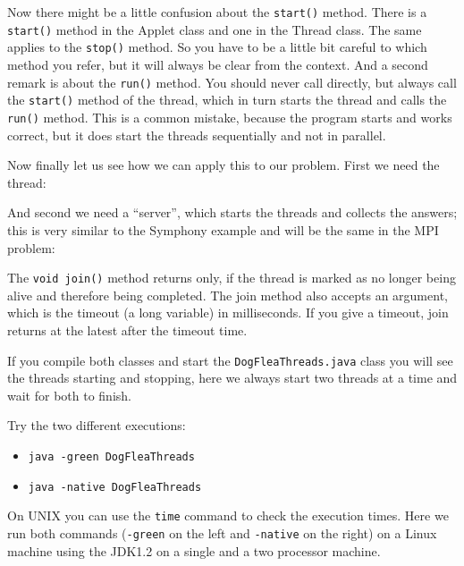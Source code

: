 Now there might be a little confusion about the \verb|start()| method.
There is a \verb|start()| method in the Applet class and one in the Thread
class. The same applies to the \verb|stop()| method. So you have to be a little 
bit careful to which method you refer, but it will always be clear from
the context. And a second remark is about the \verb|run()| method. 
You should never call directly, but always call the  \verb|start()| method
of the thread, which in turn starts the thread and calls the \verb|run()| method.
This is a common mistake, because the program starts and works correct, but
it does start the threads sequentially and not in parallel. 

Now finally let us see how we can apply this to our problem. First we need
the thread:

And second we need a ``server'', which starts the threads and collects
the answers; this is very similar to the Symphony example and will be
the same in the MPI problem:

The \verb|void join()| method returns only, if the thread is marked
as no longer being alive and therefore being completed. The join method
also accepts an argument, which is the timeout (a long variable) in milliseconds.
 If you give
a timeout, join returns at the latest after the timeout time.

If you compile both classes and start the \verb|DogFleaThreads.java| class
you will see the threads starting and stopping, here we always start two
threads at a time and wait for both to finish. 

Try the two different executions:
\begin{itemize}
\item \verb|java -green DogFleaThreads|
\item \verb|java -native DogFleaThreads|
\end{itemize}
On UNIX you can use the \verb|time| command to check the execution times.
Here we run both commands (\verb|-green| on the left and \verb|-native| on the right)
on a Linux machine using the JDK1.2 on a single
and a two processor machine.

